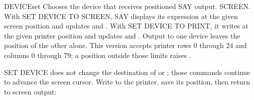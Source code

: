 \begin{XbaseEntry}{DEVICE}{set}
Chooses the device that receives positioned SAY output.
\Syntax
{}
\Defaults
SCREEN.
\Usage
With SET DEVICE TO SCREEN,  SAY displays its expression at the given
screen position and updates  and .  With SET DEVICE TO
PRINT, it writes at the given printer position and updates  and
.  Output to one device leaves the position of the other alone.
This version accepts printer rows 0 through 24 and columns 0 through 79;
a position outside those limits raises
.

SET DEVICE does not change the destination of  or ; those
commands continue to advance the screen cursor.
\Examples
Write to the printer, save its position, then return to screen output:
\end{XbaseEntry}
